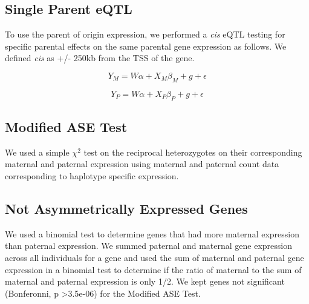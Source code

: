 \subsection{Single Parent eQTL}\label{Single Parent eQTL}
To use the parent of origin expression, we performed a \emph{cis} eQTL testing for specific parental effects on the same parental gene expression as follows. We defined \emph{cis} as +/- 250kb from the TSS of the gene. 

\begin{equation}
Y _{M}=W\alpha + X_{M}\beta_{M}+g+\epsilon
\end{equation}

\begin{equation}
Y _{P}=W\alpha + X_{P}\beta_{P}+g+\epsilon
\end{equation}


\subsection{Modified ASE Test}\label{Modified ASE Test}
We used a simple $\chi^2$ test on the reciprocal heterozygotes on their corresponding maternal and paternal expression using maternal and paternal count data corresponding to haplotype specific expression. 


\subsection{Not Asymmetrically Expressed Genes}\label{Not Asymmetrically Expressed Genes}
We used a binomial test to determine genes that had more maternal expression than paternal expression. We summed paternal and maternal gene expression across all individuals for a gene and used the sum of maternal and paternal gene expression in a binomial test to determine if the ratio of maternal to the sum of maternal and paternal expression is only 1/2. We kept genes not significant (Bonferonni, p \textgreater 3.5e-06) for the Modified ASE Test. 




